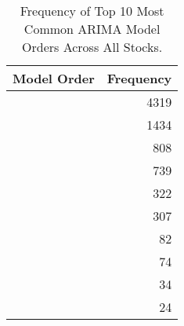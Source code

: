 \begin{table}
\caption{Frequency of Top 10 Most Common ARIMA Model Orders Across All Stocks.}
\label{tab:arima_orders}
\begin{tabular}{lr}
\toprule
Model Order & Frequency \\
\midrule
[0 0 0] & 4319 \\
[0 0 1] & 1434 \\
[1 0 0] & 808 \\
[1 0 1] & 739 \\
[0 0 2] & 322 \\
[2 0 0] & 307 \\
[2 0 1] & 82 \\
[3 0 0] & 74 \\
[0 0 3] & 34 \\
[1 0 2] & 24 \\
\bottomrule
\end{tabular}
\end{table}
